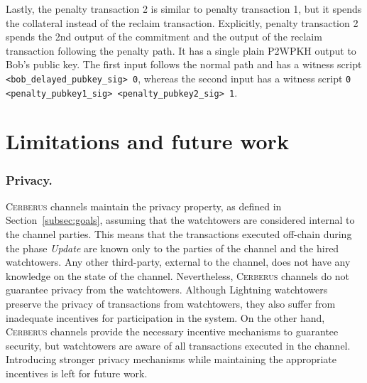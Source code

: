 \documentclass[runningheads]{llncs}
\newcommand{\sys}{\textsc{Cerberus}\xspace}
\begin{document}
Lastly, the penalty transaction 2 is similar to penalty transaction 1, but it spends the collateral instead of the reclaim transaction. Explicitly, penalty transaction 2 spends the 2nd output of the commitment and the output of the reclaim transaction following the penalty path. It has a single plain P2WPKH output to Bob's public key. The first input follows the normal path and has a witness script \texttt{<bob\_delayed\_pubkey\_sig> 0}, whereas the second input has a witness script \texttt{0 <penalty\_pubkey1\_sig> <penalty\_pubkey2\_sig> 1}.


\section{Limitations and future work}\label{sec:limit}

\vspace{-3pt}
\subsubsection*{Privacy.}
\sys channels maintain the privacy property, as defined in Section~\ref{subsec:goals}, assuming that the watchtowers are considered internal to the channel parties. This means that the transactions executed off-chain during the phase \textit{Update} are known only to the parties of the channel and the hired watchtowers. Any other third-party, external to the channel, does not have any knowledge on the state of the channel.
Nevertheless, \sys channels do not guarantee privacy from the watchtowers.
Although Lightning watchtowers preserve the privacy of transactions from watchtowers, they also suffer from inadequate incentives for participation in the system. On the other hand, \sys channels provide the necessary incentive mechanisms to guarantee security, but watchtowers are aware of all transactions executed in the channel.
Introducing stronger privacy mechanisms while maintaining the appropriate incentives is left for future work.
\end{document}

